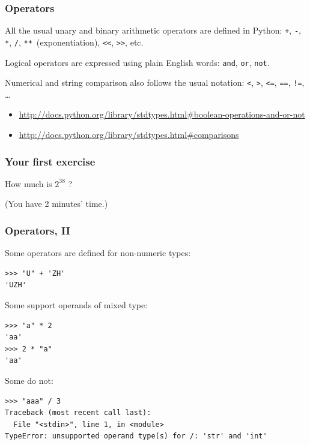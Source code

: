 \documentclass[english,serif,mathserif,xcolor=pdftex,dvipsnames,table]{beamer}
\begin{document}
\begin{frame}[fragile]
  \frametitle{Operators}
  All the usual unary and binary arithmetic operators are
  defined in Python: \texttt{+}, \texttt{-}, \texttt{*}, \texttt{/},
  \texttt{**}~(exponentiation), \texttt{<<}, \texttt{>>}, etc.

  \+
  Logical operators are expressed using plain English words:
  \texttt{and}, \texttt{or}, \texttt{not}.

  \+
  Numerical and string comparison also follows the usual notation:
  \texttt{<}, \texttt{>}, \texttt{<=}, \texttt{==}, \texttt{!=},
  \ldots

  \+
  \begin{references}
    \tiny
    \begin{itemize}
    \item
      \url{http://docs.python.org/library/stdtypes.html#boolean-operations-and-or-not}
    \item
      \url{http://docs.python.org/library/stdtypes.html#comparisons}
    \end{itemize}
  \end{references}
\end{frame}


\begin{frame}
  \frametitle{Your first exercise}
  \begin{center}
    {\Large How much is \href{http://www.pythonchallenge.com}{$2^{38}$} ?}

    \+
    (You have 2 minutes' time.)
  \end{center}
\end{frame}


\begin{frame}[fragile]
  \frametitle{Operators, II}
  Some operators are defined for non-numeric types:
\begin{lstlisting}
>>> "U" + 'ZH'
'UZH'
\end{lstlisting}

  \+
  Some support operands of mixed type:
\begin{lstlisting}
>>> "a" * 2
'aa'
>>> 2 * "a"
'aa'
\end{lstlisting}

  \+
  Some do not:
\begin{lstlisting}[basicstyle=\footnotesize\ttfamily]
>>> "aaa" / 3
Traceback (most recent call last):
  File "<stdin>", line 1, in <module>
TypeError: unsupported operand type(s) for /: 'str' and 'int'
\end{lstlisting}
\end{frame}
\end{document}

